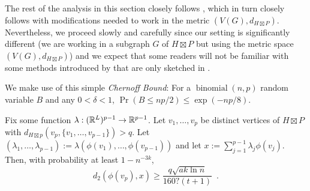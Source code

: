 \documentclass{patmorin}
\newcommand{\defin}[1]{\emph{\textcolor{brightmaroon}{#1}}}
\begin{document}
The rest of the analysis in this section closely follows \citet{rao:small}, which in turn closely follows \citet{feige:approximating} with modifications needed to work in the metric $(V(G),d_{H\boxtimes P})$.  Nevertheless, we proceed slowly and carefully since our setting is significantly different (we are working in a subgraph $G$ of $H\boxtimes P$ but using the metric space $(V(G),d_{H\boxtimes P})$) and we expect that some readers will not be familiar with some methods introduced by \citet{feige:approximating} that are only sketched in \citet{rao:small}.


We make use of this simple \defin{Chernoff Bound}: For a $\operatorname{binomial}(n,p)$ random variable $B$ and any $0<\delta<1$, $\Pr(B \le np/2) \le \exp(-np/8)$.



\begin{lem}\label{crux}
  Fix some function $\lambda:(\mathbb{R}^{L})^{p-1}\to \mathbb{R}^{p-1}$. Let $v_1,\ldots,v_p$ be distinct vertices of $H\boxtimes P$ with $d_{H\boxtimes p}(v_p,\{v_1,\ldots,v_{p-1}\})> q$.  Let $(\lambda_1,\ldots,\lambda_{p-1}):=\lambda(\phi(v_1),\ldots,\phi(v_{p-1}))$ and let $x:=\sum_{j=1}^{p-1}\lambda_j\phi(v_j)$.
  Then, with probability at least $1-n^{-3k}$,
  \[
    d_2(\phi(v_p),x)\ge \frac{q\sqrt{ak\ln  n}}{160?(t+1)} \enspace
  . \]
\end{lem}
\end{document}
